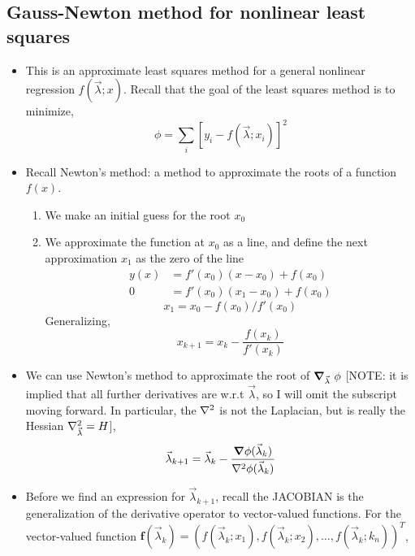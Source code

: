 \documentclass[12pt]{article}
\numberwithin{equation}{section}
\begin{document}
\subsection{Gauss-Newton method for nonlinear least squares}
\begin{itemize}
	\item This is an approximate least squares method for a general nonlinear regression $ f(\vec{\lambda}; x) $. Recall that the goal of the least squares method is to minimize,
	\begin{equation}
			\phi = \sum_i [y_i - f(\vec{\lambda};x_i)]^2
	\end{equation}
	\item Recall Newton's method: a method to approximate the roots of a function $ f(x) $.
\begin{enumerate}
	\item We make an initial guess for the root $ x_0 $
	\item We approximate the function at $ x_0 $ as a line, and define the next approximation $ x_1 $ as the zero of the line
	\begin{align}
			y(x) &= f'(x_0)(x-x_0) + f(x_0)\\
			0 &= f'(x_0)(x_1-x_0) + f(x_0)
	\end{align}
	\begin{equation}
			x_1 = x_0 - f(x_0)/f'(x_0)
	\end{equation}
Generalizing,
\begin{equation}
			x_{k+1} = x_k -  \frac{f(x_k)}{f'(x_k)}
\end{equation}
\end{enumerate}
\item We can use Newton's method to approximate the root of  $ \grad_{\vec{\lambda}}\  \phi $ [NOTE: it is implied that all further derivatives are w.r.t $\vec{\lambda}$, so I will omit the subscript moving forward. In particular, the $ \laplacian $ is not the Laplacian, but is really the Hessian $ \laplacian_{\vec{\lambda}} = H $],
\begin{equation}
		\vec{\lambda}_{k+1} = 	\vec{\lambda}_{k} - \frac{\grad\phi(\vec{\lambda}_k)}{\laplacian\phi(\vec{\lambda}_k)} 
\end{equation}
\item Before we find an expression for $ \vec{\lambda}_{k+1}  $, recall the JACOBIAN is the generalization of the derivative operator to vector-valued functions. For the vector-valued function $ \mathbf{f}(\vec{\lambda}_k) = \left(f(\vec{\lambda}_k; x_1), f(\vec{\lambda}_k; x_2), \dots, f(\vec{\lambda}_k; k_n)\right)^T$,

\end{itemize}
\end{document}
